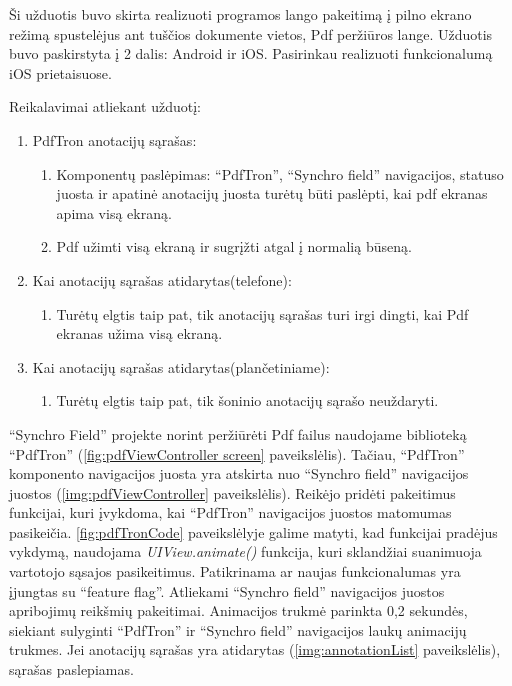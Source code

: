 Ši užduotis buvo skirta realizuoti programos lango pakeitimą į pilno ekrano režimą spustelėjus ant tuščios dokumente vietos, Pdf peržiūros lange. Užduotis buvo paskirstyta į 2 dalis: Android ir iOS. Pasirinkau realizuoti funkcionalumą iOS prietaisuose.

Reikalavimai atliekant užduotį:

\begin{enumerate}
    \item PdfTron anotacijų sąrašas:
    \begin{enumerate}
        \item Komponentų paslėpimas: \enquote{PdfTron}, \enquote{Synchro field} navigacijos, statuso juosta ir apatinė anotacijų juosta turėtų būti paslėpti, kai pdf ekranas apima visą ekraną.
        \item Pdf užimti visą ekraną ir sugrįžti atgal į normalią būseną.
    \end{enumerate}
    \item Kai anotacijų sąrašas atidarytas(telefone):
    \begin{enumerate}
        \item Turėtų elgtis taip pat, tik anotacijų sąrašas turi irgi dingti, kai Pdf ekranas užima visą ekraną.
    \end{enumerate}
    \item Kai anotacijų sąrašas atidarytas(plančetiniame):
    \begin{enumerate}
        \item Turėtų elgtis taip pat, tik šoninio anotacijų sąrašo neuždaryti.
    \end{enumerate}
\end{enumerate}


\enquote{Synchro Field} projekte norint peržiūrėti Pdf failus naudojame biblioteką \enquote{PdfTron} (\ref{fig:pdfViewController screen} paveikslėlis). Tačiau, \enquote{PdfTron} komponento navigacijos juosta yra atskirta nuo \enquote{Synchro field} navigacijos juostos (\ref{img:pdfViewController} paveikslėlis). Reikėjo pridėti pakeitimus funkcijai, kuri įvykdoma, kai \enquote{PdfTron} navigacijos juostos matomumas pasikeičia. \ref{fig:pdfTronCode} paveikslėlyje galime matyti, kad funkcijai pradėjus vykdymą, naudojama \textit{UIView.animate()} funkcija, kuri sklandžiai suanimuoja vartotojo sąsajos pasikeitimus. Patikrinama ar naujas funkcionalumas yra įjungtas su \enquote{feature flag}. Atliekami \enquote{Synchro field} navigacijos juostos apribojimų reikšmių pakeitimai. Animacijos trukmė parinkta 0,2 sekundės, siekiant sulyginti \enquote{PdfTron} ir \enquote{Synchro field} navigacijos laukų animacijų trukmes. Jei anotacijų sąrašas yra atidarytas (\ref{img:annotationList} paveikslėlis), sąrašas paslepiamas.

